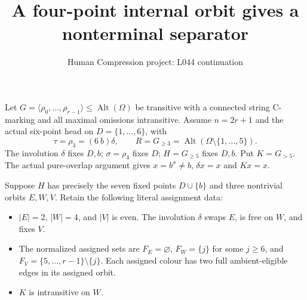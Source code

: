 \documentclass[11pt,a4paper]{article}
\title{A four-point internal orbit gives a nonterminal separator}
\author{Human Compression project: L044 continuation}
\date{}
\newcommand{\gen}[1]{\langle#1\rangle}
\newcommand{\Alt}{\operatorname{Alt}}
\begin{document}
\maketitle
Let $G=\gen{\rho_0,\ldots,\rho_{r-1}}\le\Alt(\Omega)$
be transitive with a connected string C-marking and all
maximal omissions intransitive. Assume $n=2r+1$ and the
actual six-point head on $D=\{1,\ldots,6\}$, with
\[
 \tau=\rho_3=(6\ b)\delta,\qquad
 R=G_{\ge3}=\Alt(\Omega\setminus\{1,\ldots,5\}).
\]
The involution $\delta$ fixes $D,b$; $\sigma=\rho_4$
fixes $D$; $H=G_{\ge5}$ fixes $D,b$.
Put $K=G_{>5}$. The actual pure-overlap argument gives
$x=b^\sigma\ne b$, $\delta x=x$ and $Kx=x$.

Suppose $H$ has precisely the seven fixed points $D\cup\{b\}$
and three nontrivial orbits $E,W,V$. Retain the following
literal assignment data:
\begin{itemize}
\item $|E|=2$, $|W|=4$, and $|V|$ is even. The involution
      $\delta$ swaps $E$, is free on $W$, and fixes $V$.
\item The normalized assigned sets are $F_E=\varnothing$,
      $F_W=\{j\}$ for some $j\ge6$, and
      $F_V=\{5,\ldots,r-1\}\setminus\{j\}$.
      Each assigned colour has two full ambient-eligible
      edges in its assigned orbit.
\item $K$ is intransitive on $W$.
\end{itemize}
\end{document}
